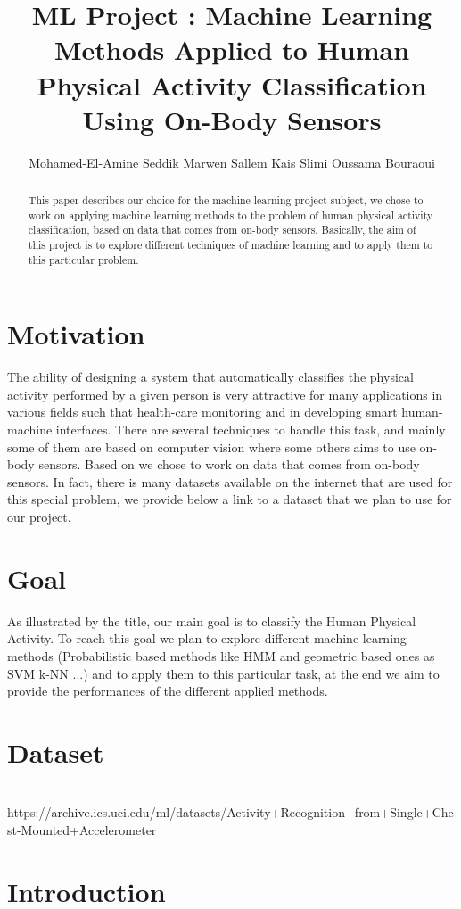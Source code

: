 \documentclass[11pt,a4paper,oneside]{article}
\author{Mohamed-El-Amine Seddik \hspace*{2em} Marwen Sallem \hspace*{2em} Kais Slimi \hspace*{2em} Oussama Bouraoui}
\title{ML Project : Machine Learning Methods Applied to Human Physical Activity Classification Using On-Body Sensors}
\begin{document}
\maketitle
\begin{abstract}
This paper describes our choice for the machine learning project subject, we chose to work on applying machine learning methods to the problem of human physical activity classification, based on data that comes from on-body sensors. Basically, the aim of this project is to explore different techniques of machine learning and to apply them to this particular problem.
\end{abstract}
\section*{Motivation}
The ability of designing a system that automatically classifies the physical activity performed by a given person is very attractive for many applications in various fields such that health-care monitoring and in developing smart human-machine interfaces. There are several techniques to handle this task, and mainly some of them are based on computer vision where some others aims to use on-body sensors. Based on \cite{mannini} we chose to work on data that comes from on-body sensors. In fact, there is many datasets available on the internet that are used for this special problem, we provide below a link to a dataset that we plan to use for our project. 
\section*{Goal}
As illustrated by the title, our main goal is to classify the Human Physical Activity. To reach this goal we plan to explore different machine learning methods (Probabilistic based methods like HMM and geometric based ones as SVM k-NN ...) and to apply them to this particular task, at the end we aim to provide the performances of the different applied methods.
\section*{Dataset}
- https://archive.ics.uci.edu/ml/datasets/Activity+Recognition+from+Single+Chest-Mounted+Accelerometer

\newpage

\section*{Introduction}
\end{document}
